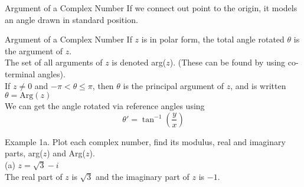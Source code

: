 \documentclass[t,usenames,dvipsnames]{beamer}
\begin{document}
\begin{frame}{Argument of a Complex Number}
    If we connect out point to the origin, it models an angle drawn in standard position. \newline\\
    
    \begin{center}
    \end{center}
\end{frame}

\begin{frame}{Argument of a Complex Number}
    If $z$ is in polar form, the total angle rotated $\theta$ is the \alert{argument} of $z$. \newline\\
    
    The set of all arguments of $z$ is denoted \alert{arg($z$)}. (These can be found by using co-terminal angles).    \newline\\
    
    If $z \neq 0$ and $-\pi < \theta \leq \pi$, then $\theta$ is the \alert{principal argument} of $z$, and is written \alert{$\theta = \text{Arg}(z)$}    \newline\\
    
    We can get the angle rotated via reference angles using
    \[
    \theta ' = \tan^{-1} \left( \frac{y}{x} \right)
    \]
\end{frame}

\begin{frame}{Example 1a.}
    Plot each complex number, find its modulus, real and imaginary parts, arg($z$) and Arg($z$). \newline\\
    
    (a) \quad   $z = \sqrt{3} - i$  \newline\\
    \pause
    The real part of $z$ is $\sqrt{3}$ and the imaginary part of $z$ is $-1$.
\end{frame}
\end{document}
